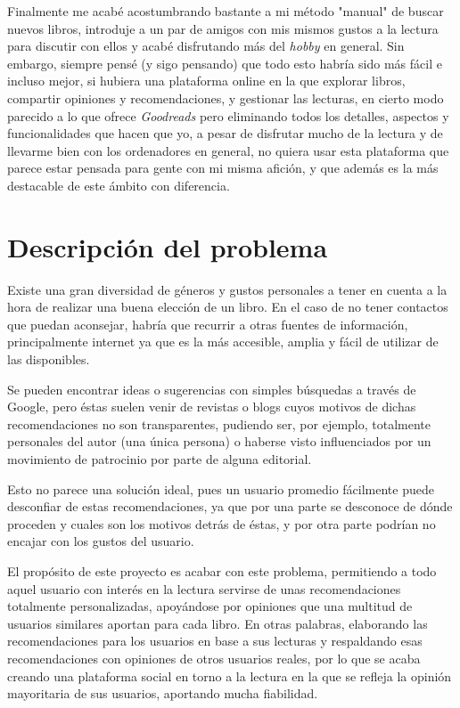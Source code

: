 Finalmente me acabé acostumbrando bastante a mi método "manual" de buscar nuevos libros, introduje a un par de amigos con mis mismos gustos a la lectura para discutir con ellos y acabé disfrutando más del \textit{hobby} en general. Sin embargo, siempre pensé (y sigo pensando) que todo esto habría sido más fácil e incluso mejor, si hubiera una plataforma online en la que explorar libros, compartir opiniones y recomendaciones, y gestionar las lecturas, en cierto modo parecido a lo que ofrece \textit{Goodreads} pero eliminando todos los detalles, aspectos y funcionalidades que hacen que yo, a pesar de disfrutar mucho de la lectura y de llevarme bien con los ordenadores en general, no quiera usar esta plataforma que parece estar pensada para gente con mi misma afición, y que además es la más destacable de este ámbito con diferencia.

\section{Descripción del problema}

Existe una gran diversidad de géneros y gustos personales a tener en cuenta a la hora de realizar una buena elección de un libro. En el caso de no tener contactos que puedan aconsejar, habría que recurrir a otras fuentes de información, principalmente internet ya que es la más accesible, amplia y fácil de utilizar de las disponibles.

Se pueden encontrar ideas o sugerencias con simples búsquedas a través de Google, pero éstas suelen venir de revistas o blogs cuyos motivos de dichas recomendaciones no son transparentes, pudiendo ser, por ejemplo, totalmente personales del autor (una única persona) o haberse visto influenciados por un movimiento de patrocinio por parte de alguna editorial.

Esto no parece una solución ideal, pues un usuario promedio fácilmente puede desconfiar de estas recomendaciones, ya que por una parte se desconoce de dónde proceden y cuales son los motivos detrás de éstas, y por otra parte podrían no encajar con los gustos del usuario.

El propósito de este proyecto es acabar con este problema, permitiendo a todo aquel usuario con interés en la lectura servirse de unas recomendaciones totalmente personalizadas, apoyándose por opiniones que una multitud de usuarios similares aportan para cada libro. En otras palabras, elaborando las recomendaciones para los usuarios en base a sus lecturas y respaldando esas recomendaciones con opiniones de otros usuarios reales, por lo que se acaba creando una plataforma social en torno a la lectura en la que se refleja la opinión mayoritaria de sus usuarios, aportando mucha fiabilidad.

